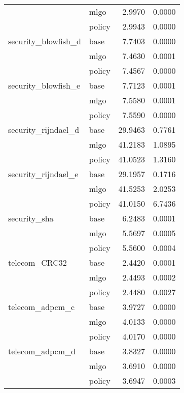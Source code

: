 \begin{table*}
\begin{tabular}[t]{llrr}
                & mlgo &        2.9970 &    0.0000 \\
                & policy &        2.9943 &    0.0000 \\
security\_blowfish\_d & base &        7.7403 &    0.0000 \\
                & mlgo &        7.4630 &    0.0001 \\
                & policy &        7.4567 &    0.0000 \\
security\_blowfish\_e & base &        7.7123 &    0.0001 \\
                & mlgo &        7.5580 &    0.0001 \\
                & policy &        7.5590 &    0.0000 \\
security\_rijndael\_d & base &       29.9463 &    0.7761 \\
                & mlgo &       41.2183 &    1.0895 \\
                & policy &       41.0523 &    1.3160 \\
security\_rijndael\_e & base &       29.1957 &    0.1716 \\
                & mlgo &       41.5253 &    2.0253 \\
                & policy &       41.0150 &    6.7436 \\
security\_sha & base &        6.2483 &    0.0001 \\
                & mlgo &        5.5697 &    0.0005 \\
                & policy &        5.5600 &    0.0004 \\
telecom\_CRC32 & base &        2.4420 &    0.0001 \\
                & mlgo &        2.4493 &    0.0002 \\
                & policy &        2.4480 &    0.0027 \\
telecom\_adpcm\_c & base &        3.9727 &    0.0000 \\
                & mlgo &        4.0133 &    0.0000 \\
                & policy &        4.0170 &    0.0000 \\
telecom\_adpcm\_d & base &        3.8327 &    0.0000 \\
                & mlgo &        3.6910 &    0.0000 \\
                & policy &        3.6947 &    0.0003 \\
\bottomrule
\end{tabular}

\end{table*}
